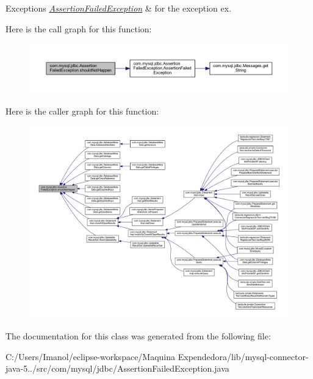 \begin{DoxyExceptions}{Exceptions}
{\em \mbox{\hyperlink{classcom_1_1mysql_1_1jdbc_1_1_assertion_failed_exception}{Assertion\+Failed\+Exception}}} & for the exception ex. \\
\hline
\end{DoxyExceptions}
Here is the call graph for this function\+:\nopagebreak
\begin{figure}[H]
\begin{center}
\leavevmode
\includegraphics[width=350pt]{classcom_1_1mysql_1_1jdbc_1_1_assertion_failed_exception_a2477a2df55a2af9c8e127fc9a8a0fc34_cgraph}
\end{center}
\end{figure}
Here is the caller graph for this function\+:\nopagebreak
\begin{figure}[H]
\begin{center}
\leavevmode
\includegraphics[width=350pt]{classcom_1_1mysql_1_1jdbc_1_1_assertion_failed_exception_a2477a2df55a2af9c8e127fc9a8a0fc34_icgraph}
\end{center}
\end{figure}


The documentation for this class was generated from the following file\+:\begin{DoxyCompactItemize}
\item 
C\+:/\+Users/\+Imanol/eclipse-\/workspace/\+Maquina Expendedora/lib/mysql-\/connector-\/java-\/5../src/com/mysql/jdbc/Assertion\+Failed\+Exception.\+java\end{DoxyCompactItemize}
